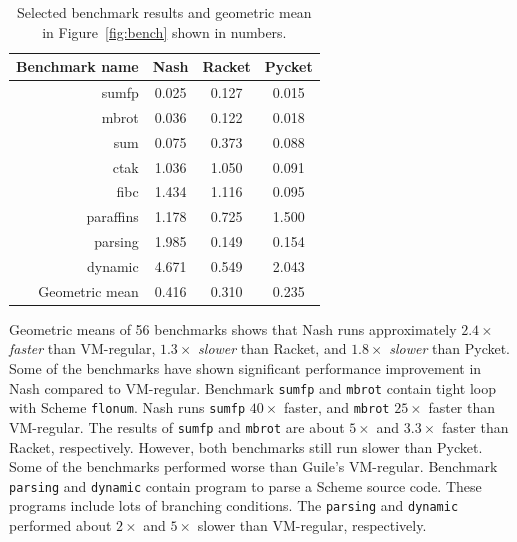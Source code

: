 \documentclass[preprint, 10pt]{sigplanconf}
\begin{document}
\begin{table}
  \centering
  \begin{tabular}{rccc}
    \toprule
    Benchmark name & Nash & Racket & Pycket\\
    \midrule
    sumfp & 0.025 & 0.127 & 0.015 \\
    mbrot & 0.036 & 0.122 & 0.018 \\
    sum & 0.075 & 0.373 & 0.088 \\
    \midrule
    ctak & 1.036 & 1.050 & 0.091 \\
    fibc & 1.434 & 1.116 & 0.095 \\
    \midrule
    paraffins & 1.178 & 0.725 & 1.500 \\
    parsing & 1.985 & 0.149 & 0.154 \\
    dynamic & 4.671 & 0.549 & 2.043 \\
    \midrule
    Geometric mean & 0.416 & 0.310 & 0.235 \\
    \bottomrule
  \end{tabular}
  \caption{Selected benchmark results and geometric mean in
    Figure~\hyperref[fig:bench]{\ref{fig:bench}} shown in numbers.}
\label{tab:bench}
\end{table}

Geometric means of 56 benchmarks shows that Nash runs approximately $2.4\times$
\textit{faster} than VM-regular, $1.3\times$ \textit{slower} than Racket, and
$1.8\times$ \textit{slower} than Pycket.  Some of the benchmarks have shown
significant performance improvement in Nash compared to VM-regular. Benchmark
\texttt{sumfp} and \texttt{mbrot} contain tight loop with Scheme
\texttt{flonum}. Nash runs \texttt{sumfp} $40\times$ faster, and \texttt{mbrot}
$25\times$ faster than VM-regular. The results of \texttt{sumfp} and
\texttt{mbrot} are about $5\times$ and $3.3\times$ faster than Racket,
respectively. However, both benchmarks still run slower than Pycket.  Some of
the benchmarks performed worse than Guile's VM-regular. Benchmark
\texttt{parsing} and \texttt{dynamic} contain program to parse a Scheme source
code. These programs include lots of branching conditions. The \texttt{parsing}
and \texttt{dynamic} performed about $2\times$ and $5\times$ slower than
VM-regular, respectively.


\end{document}
